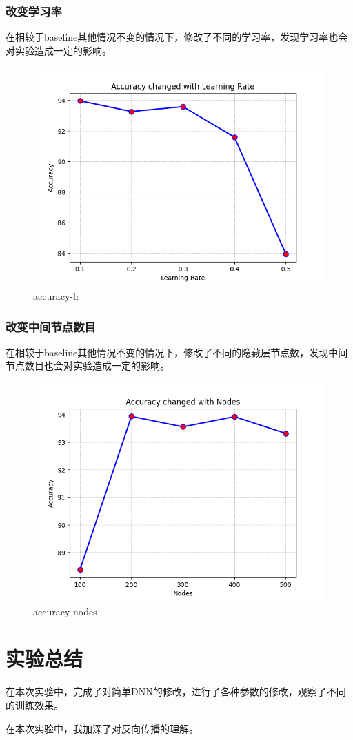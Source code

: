 \documentclass[12pt,a4paper]{article}
\begin{document}
\subsubsection{改变学习率}

在相较于baseline其他情况不变的情况下，修改了不同的学习率，发现学习率也会对实验造成一定的影响。

\begin{figure}[htbp]
    \centering
    \includegraphics[width=0.5\linewidth]{img/accuracy-lr.png}
    \caption{accuracy-lr}
\end{figure} 

\subsubsection{改变中间节点数目}

在相较于baseline其他情况不变的情况下，修改了不同的隐藏层节点数，发现中间节点数目也会对实验造成一定的影响。

\begin{figure}[htbp]
    \centering
    \includegraphics[width=0.5\linewidth]{img/accuracy-nodes.png}
    \caption{accuracy-nodes}
\end{figure} 

\section{实验总结}

在本次实验中，完成了对简单DNN的修改，进行了各种参数的修改，观察了不同的训练效果。

在本次实验中，我加深了对反向传播的理解。
\end{document}
